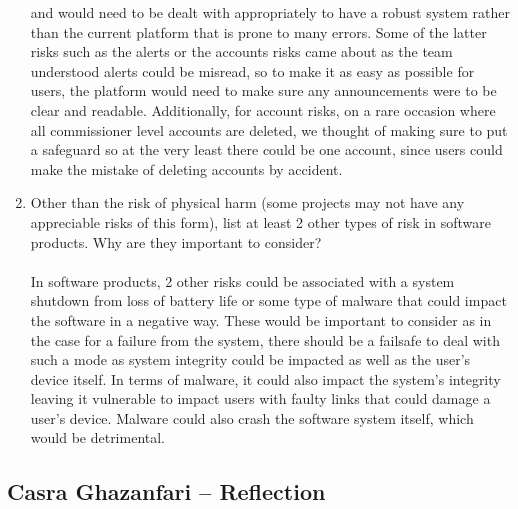 \documentclass{article}
\begin{document}
\begin{enumerate}
  and would need to be dealt with appropriately to have a robust system rather than the
  current platform that is prone to many errors. Some of the latter risks such as the
  alerts or the accounts risks came about as the team understood alerts could be misread,
  so to make it as easy as possible for users, the platform would need to make sure any
  announcements were to be clear and readable. Additionally, for account risks,
  on a rare occasion where all commissioner level accounts are deleted, we thought of
  making sure to put a safeguard so at the very least there could be one account, since
  users could make the mistake of deleting accounts by accident.
  \item Other than the risk of physical harm (some projects may not have any
  appreciable risks of this form), list at least 2 other types of risk in
  software products. Why are they important to consider?\\\\
  In software products, 2 other risks could be associated with a system shutdown from
  loss of battery life or some type of malware that could impact the software in
  a negative way. These would be important to consider as in the case for a failure
  from the system, there should be a failsafe to deal with such a mode as system integrity
  could be impacted as well as the user's device itself. In terms of malware, it could
  also impact the system's integrity leaving it vulnerable to impact users with faulty
  links that could damage a user's device. Malware could also crash the software system
  itself, which would be detrimental.

\end{enumerate}

\subsection*{Casra Ghazanfari -- Reflection}
\end{document}
